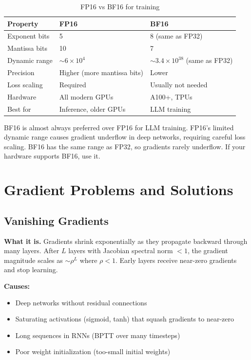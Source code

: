 \begin{table}[H]
\centering
\caption{FP16 vs BF16 for training}
\begin{tabularx}{\textwidth}{lXX}
\toprule
\textbf{Property} & \textbf{FP16} & \textbf{BF16} \\
\midrule
Exponent bits & 5 & 8 (same as FP32) \\
Mantissa bits & 10 & 7 \\
Dynamic range & $\sim 6 \times 10^{4}$ & $\sim 3.4 \times 10^{38}$ (same as FP32) \\
Precision & Higher (more mantissa bits) & Lower \\
Loss scaling & Required & Usually not needed \\
Hardware & All modern GPUs & A100+, TPUs \\
Best for & Inference, older GPUs & LLM training \\
\bottomrule
\end{tabularx}
\end{table}

\begin{warningbox}
BF16 is almost always preferred over FP16 for LLM training. FP16's limited dynamic range causes gradient underflow in deep networks, requiring careful loss scaling. BF16 has the same range as FP32, so gradients rarely underflow. If your hardware supports BF16, use it.
\end{warningbox}

\section{Gradient Problems and Solutions}
\label{sec:gradient_problems}

\subsection{Vanishing Gradients}

\textbf{What it is.} Gradients shrink exponentially as they propagate backward through many layers. After $L$ layers with Jacobian spectral norm $< 1$, the gradient magnitude scales as $\sim \rho^L$ where $\rho < 1$. Early layers receive near-zero gradients and stop learning.

\textbf{Causes:}
\begin{itemize}
    \item Deep networks without residual connections
    \item Saturating activations (sigmoid, tanh) that squash gradients to near-zero
    \item Long sequences in RNNs (BPTT over many timesteps)
    \item Poor weight initialization (too-small initial weights)
\end{itemize}

